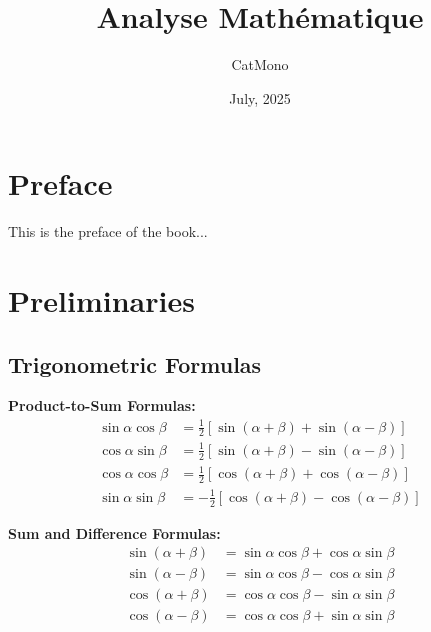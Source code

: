\documentclass[11pt]{elegantbook}
\title{Analyse Mathématique} %
\author{CatMono} %
\date{July, 2025} %
\begin{document}
\maketitle %

\frontmatter        %
\tableofcontents    %

\chapter{Preface}   %
This is the preface of the book...

\mainmatter         %

\chapter{Preliminaries} %
\section{Trigonometric Formulas} %

\textbf{Product-to-Sum Formulas:}
\begin{align*}
\sin\alpha \cos\beta &= \frac{1}{2} \left[ \sin(\alpha + \beta) + \sin(\alpha - \beta) \right] \\
\cos\alpha \sin\beta &= \frac{1}{2} \left[ \sin(\alpha + \beta) - \sin(\alpha - \beta) \right] \\
\cos\alpha \cos\beta &= \frac{1}{2} \left[ \cos(\alpha + \beta) + \cos(\alpha - \beta) \right] \\
\sin\alpha \sin\beta &= -\frac{1}{2} \left[ \cos(\alpha + \beta) - \cos(\alpha - \beta) \right]
\end{align*}

\textbf{Sum and Difference Formulas:}
\begin{align*}
\sin(\alpha + \beta) &= \sin\alpha \cos\beta + \cos\alpha \sin\beta \\
\sin(\alpha - \beta) &= \sin\alpha \cos\beta - \cos\alpha \sin\beta \\
\cos(\alpha + \beta) &= \cos\alpha \cos\beta - \sin\alpha \sin\beta \\
\cos(\alpha - \beta) &= \cos\alpha \cos\beta + \sin\alpha \sin\beta
\end{align*}
\end{document}
